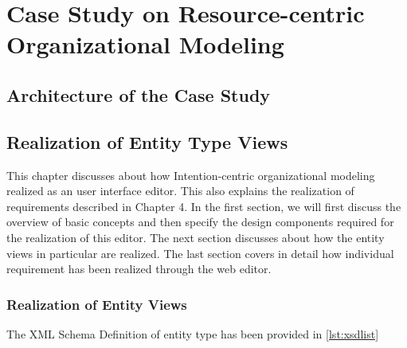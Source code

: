 \chapter{Case Study on Resource-centric Organizational Modeling}
\label{chap:casestudy}


\section{Architecture of the Case Study}
\label{sec:casestudyarchitecture}



\section{Realization of Entity Type Views}
\label{sec:realization}

 This chapter discusses about how Intention-centric organizational modeling realized as an user interface editor. This also explains the realization of requirements described in Chapter 4. In the first section, we will first discuss the overview of basic concepts and then specify the design components required for the realization of this editor. The next section discusses about how the entity views in particular are realized. The last section covers in detail how individual requirement has been realized through the web editor.




\subsection{Realization of Entity Views}
\label{subsec:realofentityviews}
The XML Schema Definition of entity type has been provided in \ref{lst:xsdlist}



